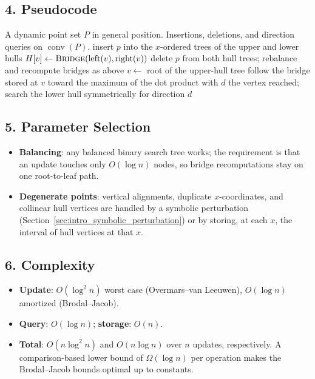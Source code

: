 \subsection{4. Pseudocode}

\begin{algorithm}[htbp]
\caption{Dynamic Convex Hull Maintenance}
\label{alg:dyn_convex_hull}
\begin{algorithmic}[1]
\Require A dynamic point set $P$ in general position.
\Ensure Insertions, deletions, and direction queries on $\operatorname{conv}(P)$.
  \State insert $p$ into the $x$-ordered trees of the upper and lower hulls
    \State $H[v] \gets \textsc{Bridge}(\text{left}(v), \text{right}(v))$
  \EndFor
\EndFunction
{}
  \State delete $p$ from both hull trees; rebalance and recompute bridges as above
\EndFunction
{}
  \State $v \gets$ root of the upper-hull tree
    \State follow the bridge stored at $v$ toward the maximum of the dot product with $d$
  \EndWhile
  \State \Return the vertex reached; search the lower hull symmetrically for direction $d$
\EndFunction
\end{algorithmic}
\end{algorithm}

\subsection{5. Parameter Selection}

\begin{itemize}
  \item \textbf{Balancing}: any balanced binary search tree works; the
    requirement is that an update touches only $O(\log n)$ nodes, so bridge
    recomputations stay on one root-to-leaf path.
  \item \textbf{Degenerate points}: vertical alignments, duplicate
    $x$-coordinates, and collinear hull vertices are handled by a symbolic
    perturbation (Section~\ref{sec:intro_symbolic_perturbation}) or by
    storing, at each $x$, the interval of hull vertices at that $x$.
\end{itemize}

\subsection{6. Complexity}

\begin{itemize}
  \item \textbf{Update}: $O(\log^2 n)$ worst case (Overmars--van Leeuwen),
    $O(\log n)$ amortized (Brodal--Jacob).
  \item \textbf{Query}: $O(\log n)$; \textbf{storage}: $O(n)$.
  \item \textbf{Total}: $O(n\log^2 n)$ and $O(n\log n)$ over $n$ updates,
    respectively. A comparison-based lower bound of $\Omega(\log n)$ per
    operation makes the Brodal--Jacob bounds optimal up to constants.
\end{itemize}

